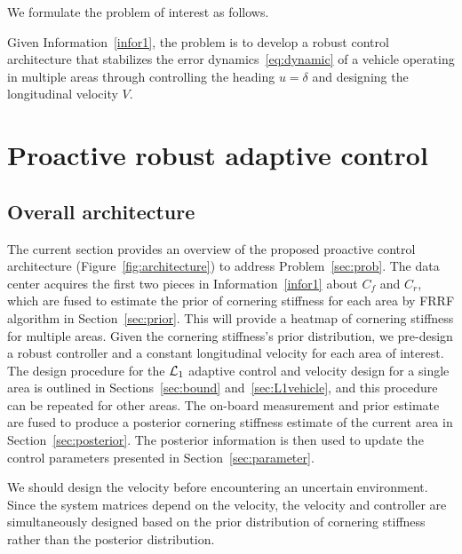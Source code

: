 \documentclass[letterpaper, 10 pt, conference]{ieeeconf}
\begin{document}
We formulate the problem of interest as follows.

\begin{problem}
Given Information~\ref{infor1}, the problem is to develop a robust control architecture that stabilizes the error dynamics~\eqref{eq:dynamic} of a vehicle operating in multiple areas through controlling the heading $u=\delta$ and designing the longitudinal velocity $V$.
\label{sec:prob}
\end{problem}

\section{Proactive robust adaptive control}\label{sec:pro}

\subsection{Overall architecture}\label{sec:pro}

The current section provides an overview of the proposed proactive control architecture (Figure~\ref{fig:architecture}) to address Problem~\ref{sec:prob}.
The data center acquires the first two pieces in Information~\ref{infor1} about $C_f$ and $C_r$, which are fused to estimate the prior of cornering stiffness for each area by FRRF algorithm in Section~\ref{sec:prior}.
This will provide a heatmap of cornering stiffness for multiple areas.
Given the cornering stiffness's prior distribution, we pre-design a robust controller and a constant longitudinal velocity for each area of interest.
The design procedure for the $\mathcal{L}_1$ adaptive control and velocity design for a single area is outlined in Sections~\ref{sec:bound} and~\ref{sec:L1vehicle}, and this procedure can be repeated for other areas.
The on-board measurement and prior estimate are fused to produce a posterior cornering stiffness estimate of the current area in Section~\ref{sec:posterior}. The posterior information is then used to update the control parameters presented in Section~\ref{sec:parameter}.

\begin{remark}
We should design the velocity before encountering an uncertain environment. %
Since the system matrices depend on the velocity, the velocity and controller are simultaneously designed based on the prior distribution of cornering stiffness rather than the posterior distribution.
\end{remark}
\end{document}
